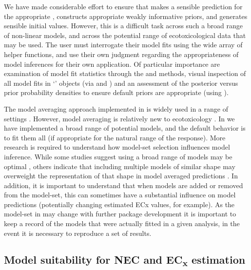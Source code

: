 \documentclass[
  shortnames]{jss}
\newcommand{\cls}[1]{`\code{#1}'}
\begin{document}
We have made considerable effort to ensure that  makes a sensible prediction for the appropriate , constructs appropriate weakly informative priors, and generates sensible initial values. However, this is a difficult task across such a broad range of non-linear models, and across the potential range of ecotoxicological data that may be used. The user must interrogate their model fits using the wide array of helper functions, and use their own judgment regarding the appropriateness of model inferences for their own application. Of particular importance are examination of model fit statistics through the  and  methods, visual inspection of all model fits in \cls{bayesmanecfit} objects (via  and ) and an assessment of the posterior versus prior probability densities to ensure default priors are appropriate (using ).

The model averaging approach implemented in  is widely used in a range of settings \citep[in ecology for example, see][ for a thorough review]{Dormann2018}. However, model averaging is relatively new to ecotoxicology \citep[but see, for example,][]{Shao2014, Thorley2018, fox2020, Wheeler2009}. In  we have implemented a broad range of potential models, and the default behavior is to fit them all (if appropriate for the natural range of the response). More research is required to understand how model-set selection influences model inference. While some studies suggest using a broad range of models may be optimal \citep{Wheeler2009}, others indicate that including multiple models of similar shape may overweight the representation of that shape in model averaged predictions \citep{fox2020}. In addition, it is important to understand that when models are added or removed from the model-set, this can sometimes have a substantial influence on model predictions (potentially changing estimated ECx values, for example). As the model-set in  may change with further package development it is important to keep a record of the models that were actually fitted in a given analysis, in the event it is necessary to reproduce a set of results.

\subsection[Model suitability for NEC and ECx estimation]{Model suitability for NEC and EC\textsubscript{x} estimation}\label{modsuit}
\end{document}
